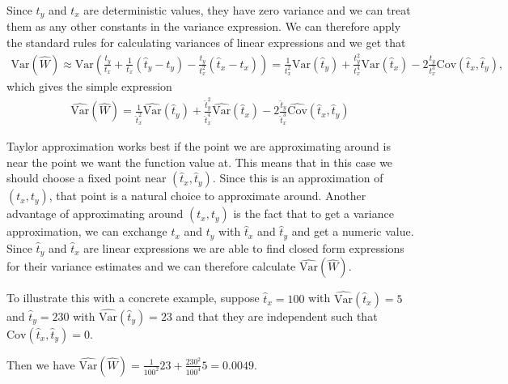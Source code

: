 \documentclass{article}
\begin{document}
\begin{example}
    Since \(t_y\) and \(t_x\) are deterministic values, they have zero variance
    and we can treat them as any other constants in the variance expression. We can therefore apply
    the standard rules for calculating variances of linear expressions and we
    get that
    \begin{align*}
      \mathrm{Var} \left( \widehat{W} \right) \approx \mathrm{Var} \left(
      \frac{t_y}{t_x} + \frac{1}{t_x} \left( \hat{t}_y - t_y \right) -
      \frac{t_y}{t_x^2} \left( \hat{t}_x - t_x \right) \right)
    = \frac{1}{t_x^2} \mathrm{Var} \left( \hat{t}_y \right) +
      \frac{t_y^2}{t_x^4} \mathrm{Var} \left( \hat{t}_x \right) -
      2 \frac{t_y}{t_x^3}\mathrm{Cov}(\hat{t}_x, \hat{t}_y),
      \end{align*}
      which gives the simple expression \begin{align*}
                    \widehat{\mathrm{Var}} \left( \widehat{W} \right) = \frac{1}{\hat{t}_x^2} \widehat{\mathrm{Var}} \left( \hat{t}_y \right) +
                    \frac{\hat{t}_y^2}{\hat{t}_x^4} \widehat{\mathrm{Var}} \left( \hat{t}_x \right) - 2 \frac{\hat{t}_y}{\hat{t}_x^3}\widehat{\mathrm{Cov}}(\hat{t}_x, \hat{t}_y)
                    \end{align*}

    Taylor approximation works best if the point we are approximating around is
    near the point we want the function value at. This means that in this case we should
    choose a fixed point near \((\hat{t}_x, \hat{t}_y)\). Since this is an approximation
    of \((t_x, t_y)\), that point is a natural choice to approximate around. Another
    advantage of approximating around \((t_x, t_y)\) is the fact that to get a
    variance approximation, we can exchange \(t_x\) and
    \(t_y\) with \(\hat{t}_x\) and \(\hat{t}_y\) and get a numeric value.
    Since \(\hat{t}_y\) and \(\hat{t}_x\) are linear expressions we are able to
    find closed form expressions for their variance estimates and we can
    therefore calculate \(\widehat{\mathrm{Var}} \left( \widehat{W} \right)\).

    To illustrate this with a concrete example, suppose \(\hat{t}_x = 100\) with
    \(\widehat{\mathrm{Var}}\left( \hat{t}_x \right) = 5\) and \(\hat{t}_y = 230\) with
    \(\widehat{\mathrm{Var}}\left( \hat{t}_y \right) = 23\) and that they are independent
    such that \(\mathrm{Cov} \left( \hat{t}_x, \hat{t}_y \right) = 0\).

    Then we have \(\widehat{\mathrm{Var}} \left( \widehat{W} \right) =
    \frac{1}{100^2} 23 + \frac{230^2}{100^4} 5 = 0.0049.\)

\end{example}
\end{document}
